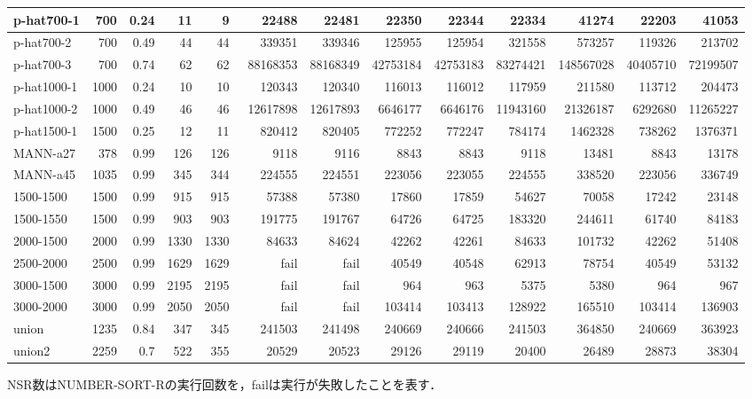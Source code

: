 \begin{table}
{\begin{tabular}{|l|r|r|r|r|r|r|r|r||r|r|r|r|}
p-hat700-1 & 700 & 0.24 & 11 & 9 &  22488 & 22481 & 22350 & 22344 & 22334 & 41274 & 22203 & 41053 \\ \hline
p-hat700-2 & 700 & 0.49 & 44 & 44 & 339351 & 339346 & 125955 & 125954 & 321558 & 573257 & 119326 & 213702 \\ \hline
p-hat700-3 & 700 & 0.74 & 62 & 62 & 88168353 & 88168349 & 42753184 & 42753183 & 83274421 & 148567028 & 40405710 & 72199507 \\ \hline
p-hat1000-1 & 1000 & 0.24 & 10 & 10 & 120343 & 120340 & 116013 & 116012 & 117959 & 211580 & 113712 & 204473 \\ \hline
p-hat1000-2 & 1000 & 0.49 & 46 & 46 &  12617898 & 12617893 & 6646177 & 6646176 & 11943160 & 21326187 & 6292680 & 11265227 \\ \hline
p-hat1500-1 & 1500 & 0.25 & 12 & 11 & 820412 & 820405 & 772252 & 772247 & 784174 & 1462328 & 738262 & 1376371 \\ \hline
MANN-a27 & 378 & 0.99 & 126 & 126 & 9118 & 9116 & 8843 & 8843 & 9118 & 13481 & 8843 & 13178 \\ \hline
MANN-a45 & 1035 & 0.99 & 345 & 344 & 224555 & 224551 & 223056 & 223055 & 224555 & 338520 & 223056 & 336749 \\ \hline
  \hline
1500-1500 & 1500 & 0.99 & 915 & 915 & 57388 & 57380 & 17860 & 17859 & 54627 & 70058 & 17242 & 23148 \\ \hline
1500-1550 & 1500 & 0.99 & 903 & 903 & 191775 & 191767 & 64726 & 64725 & 183320 & 244611 & 61740 & 84183 \\ \hline
2000-1500 & 2000 & 0.99 & 1330 & 1330 & 84633 & 84624 & 42262 & 42261 & 84633 & 101732 & 42262 & 51408 \\ \hline
2500-2000 & 2500 & 0.99 & 1629 & 1629 & fail & fail & 40549 & 40548 & 62913 & 78754 & 40549 & 53132 \\ \hline
3000-1500 & 3000 & 0.99 & 2195 & 2195 & fail & fail & 964 & 963 & 5375 & 5380 & 964 & 967 \\ \hline
3000-2000 & 3000 & 0.99 & 2050 & 2050 & fail & fail & 103414 & 103413 & 128922 & 165510 & 103414 & 136903 \\ \hline
\hline
    union & 1235 & 0.84 & 347 & 345 & 241503 & 241498 & 240669 & 240666 & 241503 & 364850 & 240669 & 363923 \\ \hline
union2 & 2259 & 0.7 & 522 & 355 & 20529 & 20523 & 29126 & 29119 & 20400 & 26489 & 28873 & 38304 \\ \hline
\end{tabular}
    }
    \begin{center}
    \scriptsize NSR数はNUMBER-SORT-Rの実行回数を，failは実行が失敗したことを表す．
    \end{center}
\end{table}


